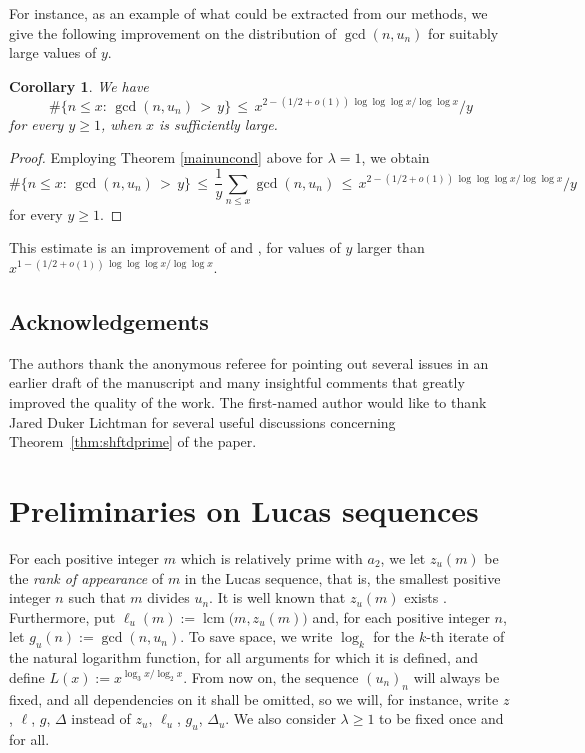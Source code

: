 \documentclass[12pt,a4paper,oneside]{amsart}
\newtheorem{corollary}[theorem]{Corollary}
\newcommand{\lcm}{\operatorname{lcm}}
\begin{document}
For instance, as an example of what could be extracted from our methods, we give the following improvement on the distribution of $\gcd(n,u_n)$ for suitably large values of $y$. 

\begin{corollary}
    We have 
    \[\#\{n \leq x:\,\gcd(n,u_n)\,>\,y\}\,\le\, x^{2-(1/2+o(1))\,\log\log\log x/\log\log x}/y\] for every $y\ge 1$, when $x$ is sufficiently large.
\end{corollary}
\begin{proof}
    Employing Theorem \ref{mainuncond} above for $\lambda=1$, we obtain 
    \[\#\{n \leq x:\,\gcd(n,u_n)\,>\,y\}\,\le\, \frac{1}{y}\sum_{n\le x} \gcd(n,u_n)\,\le\, x^{2-(1/2+o(1))\,\log\log\log x/\log\log x}/y \] for every $y\ge 1$.
\end{proof}
This estimate is an improvement of \cite[Cor. 1.5]{Ma19} and \cite[Cor. 1.3]{Sa18}, for values of $y$ larger than $x^{1-(1/2+o(1))\,\log\log\log x/\log\log x}$.

\subsection{Acknowledgements} The authors thank the anonymous referee for pointing out several issues in an earlier draft of the manuscript and many insightful comments that greatly improved the quality of the work. The first-named author would like to thank Jared Duker Lichtman for several useful discussions concerning Theorem~\ref{thm:shftdprime} of the paper.

\section{Preliminaries on Lucas sequences}



For each positive integer $m$ which is relatively prime with $a_2$, we let $z_u(m)$ be the \emph{rank of appearance} of $m$ in the Lucas sequence, that is, the smallest positive integer $n$ such that $m$ divides $u_n$.
It is well known that $z_u(m)$ exists \cite{Re13}.
Furthermore, put $\ell_u(m) := \lcm\!\big(m, z_u(m)\big)$ and, for each positive integer $n$, let $g_u(n) := \gcd(n, u_n)$.  To save space, we write $\log_k$
for the $k$-th iterate of the natural logarithm function, for all arguments for which it is defined, and define $L(x):=x^{\log_3 x/\log_2 x}$. From now on, the sequence $(u_n)_n$ will always be fixed, and all dependencies on it shall be omitted, so we will, for instance, write $z$, $\ell$, $g$, $\Delta$ instead of $z_u$, $\ell_u$, $g_u$, $\Delta_u$. We also consider $\lambda\geq 1$ to be fixed once and for all.
\end{document}
